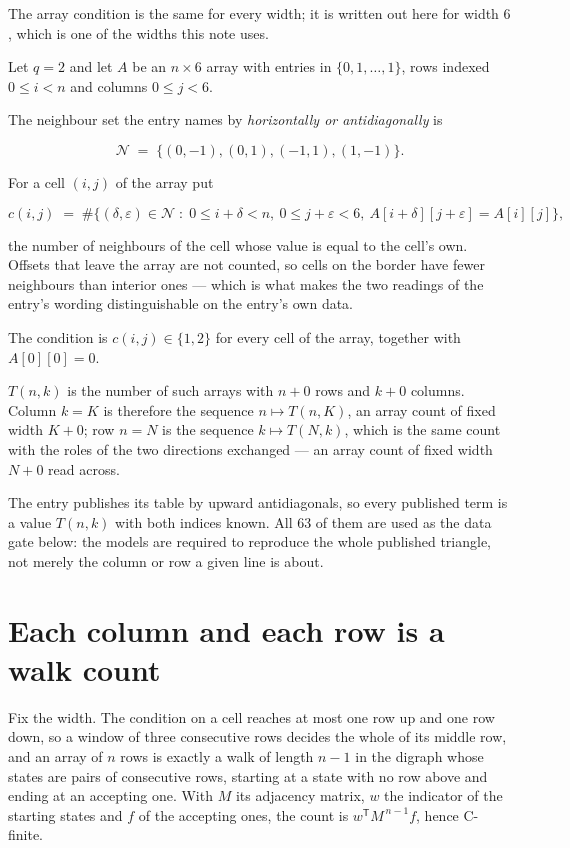 \documentclass[11pt]{article}
\theoremstyle{definition}
\begin{document}
The array condition is the same for every width; it is written out here for width $6$, which is one of the widths this note uses.

Let $q = 2$ and let $A$ be an $n \times 6$ array with entries in $\{0,1,\dots,1\}$, rows indexed $0 \le i < n$ and columns $0 \le j < 6$.

The neighbour set the entry names by {\itshape horizontally or antidiagonally} is

\[\mathcal{N} \;=\; \{(0,-1), (0,1), (-1,1), (1,-1)\}.\]

For a cell $(i,j)$ of the array put

\[c(i,j) \;=\; \#\bigl\{(\delta,\varepsilon)\in\mathcal{N} \;:\; 0\le i+\delta<n,\ 0\le j+\varepsilon<6,\ A[i+\delta][j+\varepsilon] = A[i][j]\bigr\},\]

the number of neighbours of the cell whose value is equal to the cell's own. Offsets that leave the array are not counted, so cells on the border have fewer neighbours than interior ones --- which is what makes the two readings of the entry's wording distinguishable on the entry's own data.

The condition is $c(i,j) \in \{1, 2\}$ for every cell of the array, together with $A[0][0]=0$.

$T(n,k)$ is the number of such arrays with $n + 0$ rows and $k + 0$ columns. Column $k = K$ is therefore the sequence $n \mapsto T(n,K)$, an array count of fixed width $K + 0$; row $n = N$ is the sequence $k \mapsto T(N,k)$, which is the same count with the roles of the two directions exchanged --- an array count of fixed width $N + 0$ read across.

The entry publishes its table by upward antidiagonals, so every published term is a value $T(n,k)$ with both indices known. All 63 of them are used as the data gate below: the models are required to reproduce the whole published triangle, not merely the column or row a given line is about.

\section{Each column and each row is a walk count}

Fix the width. The condition on a cell reaches at most one row up and one row down, so a window of three consecutive rows decides the whole of its middle row, and an array of $n$ rows is exactly a walk of length $n-1$ in the digraph whose states are pairs of consecutive rows, starting at a state with no row above and ending at an accepting one. With $M$ its adjacency matrix, $w$ the indicator of the starting states and $f$ of the accepting ones, the count is $w^{\mathsf T}M^{\,n-1}f$, hence C-finite.
\end{document}
